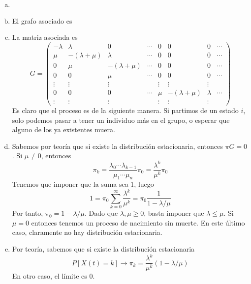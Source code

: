 \documentclass[twoside]{article}
\begin{document}
\begin{solucion}
\begin{enumerate}[a)]
\item[]
\item El grafo asociado es

\begin{center}
\end{center}
\item La matriz asociada es
$$
G= 
\begin{pmatrix}
-\lambda & \lambda & 0 &  \cdots & 0 & 0 & 0 & \cdots \\
\mu & -(\lambda + \mu) & \lambda &  \cdots& 0 & 0 & 0 &\cdots \\
0 & \mu & -(\lambda + \mu)  & \cdots & 0 & 0 & 0 &\cdots \\
0 & 0 &  \mu & \cdots & 0 & 0& 0 & \cdots\\
\vdots & \vdots& \vdots & & \vdots & \vdots & \vdots\\
0 & 0 & 0 & \cdots & \mu  & -(\lambda +  \mu) & \lambda & \cdots\\
\vdots & \vdots & \vdots & & \vdots & \vdots & \vdots
\end{pmatrix}
$$
Es claro que el proceso es de la siguiente manera. Si partimos de un estado $i$, solo podemos pasar a tener un individuo más en el grupo, o esperar que alguno de los ya existentes muera. 
\item Sabemos por teoría que si existe la distribución estacionaria, entonces $\pi G  = 0$. Si $\mu \neq 0$, entonces
$$
\pi_k = \frac{\lambda_0 \cdots \lambda_{k-1}}{\mu_1 \cdots \mu_n }\pi_0 = \frac{\lambda^k}{\mu^k}\pi_0
$$
Tenemos que imponer que la suma sea $1$, luego
$$
1 =  \pi_0 \sum_{k=0}^\infty \frac{\lambda^k}{\mu^k } = \pi_0 \frac{1}{1-\lambda/\mu}
$$
Por tanto, $\pi_0 = 1-\lambda/\mu$. Dado que $\lambda,\mu \geq 0$, basta imponer que $\lambda \leq \mu$. Si $\mu = 0$ entonces tenemos un proceso de nacimiento sin muerte. En este último caso, claramente no hay distribución estacionaria.
\item Por teoría, sabemos que si existe la distribución estacionaria
$$
P[X(t)=k] \rightarrow \pi_k = \frac{\lambda^k}{\mu^k}(1-\lambda/\mu)
$$
En otro caso, el límite es $0$.
\end{enumerate}
\end{solucion}
\end{document}
